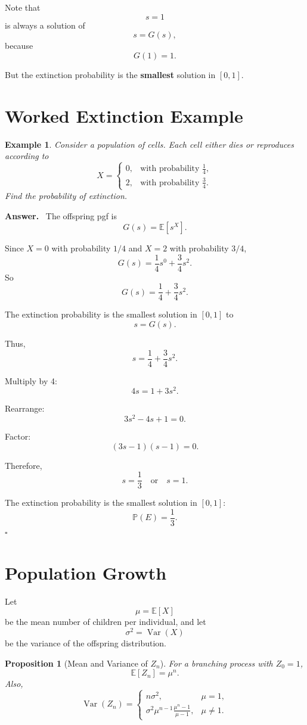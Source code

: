 \documentclass[12pt,a4paper]{article}
\theoremstyle{lecturestyle}
\newtheorem{example}{Example}
\newtheorem{proposition}{Proposition}
\newenvironment{answer}
{\par\textbf{Answer.}\ }
{\hfill$\square$\par}
\newcommand{\Prob}{\mathbb{P}}
\newcommand{\E}{\mathbb{E}}
\newcommand{\Var}{\operatorname{Var}}
\begin{document}
Note that
\[
s=1
\]
is always a solution of
\[
s=G(s),
\]
because
\[
G(1)=1.
\]

But the extinction probability is the \textbf{smallest} solution in $[0,1]$.

\section{Worked Extinction Example}

\begin{example}
Consider a population of cells. Each cell either dies or reproduces according to
\[
X=
\begin{cases}
0, & \text{with probability } \frac14,\\
2, & \text{with probability } \frac34.
\end{cases}
\]
Find the probability of extinction.
\end{example}

\begin{answer}
The offspring pgf is
\[
G(s)=\E[s^X].
\]

Since $X=0$ with probability $1/4$ and $X=2$ with probability $3/4$,
\[
G(s)=\frac14s^0+\frac34s^2.
\]
So
\[
G(s)=\frac14+\frac34s^2.
\]

The extinction probability is the smallest solution in $[0,1]$ to
\[
s=G(s).
\]

Thus,
\[
s=\frac14+\frac34s^2.
\]

Multiply by 4:
\[
4s=1+3s^2.
\]

Rearrange:
\[
3s^2-4s+1=0.
\]

Factor:
\[
(3s-1)(s-1)=0.
\]

Therefore,
\[
s=\frac13
\quad\text{or}\quad
s=1.
\]

The extinction probability is the smallest solution in $[0,1]$:
\[
\boxed{\Prob(E)=\frac13.}
\]
\end{answer}

\section{Population Growth}

Let
\[
\mu=\E[X]
\]
be the mean number of children per individual, and let
\[
\sigma^2=\Var(X)
\]
be the variance of the offspring distribution.

\begin{proposition}[Mean and Variance of $Z_n$]
For a branching process with $Z_0=1$,
\[
\E[Z_n]=\mu^n.
\]
Also,
\[
\Var(Z_n)=
\begin{cases}
n\sigma^2, & \mu=1,\\[4pt]
\displaystyle
\sigma^2\mu^{n-1}\frac{\mu^n-1}{\mu-1}, & \mu\neq 1.
\end{cases}
\]
\end{proposition}
\end{document}
